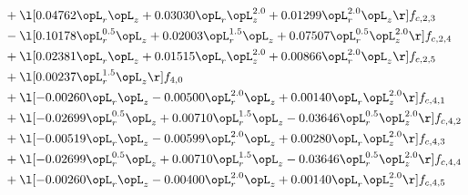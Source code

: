\begin{alignat}{2}
& + \l[  0.04762 \opL_r \opL_z +  0.03030 \opL_r \opL_z^{2.0} +  0.01299 \opL_r^{2.0} \opL_z  \r] f_{c,2,3} \nonumber \\ 
& - \l[  0.10178 \opL_r^{0.5} \opL_z +  0.02003 \opL_r^{1.5} \opL_z +  0.07507 \opL_r^{0.5} \opL_z^{2.0}  \r] f_{c,2,4} \nonumber \\ 
& + \l[  0.02381 \opL_r \opL_z +  0.01515 \opL_r \opL_z^{2.0} +  0.00866 \opL_r^{2.0} \opL_z  \r] f_{c,2,5} \nonumber \\ 
& + \l[  0.00237 \opL_r^{1.5} \opL_z  \r] f_{4,0} \nonumber \\ 
& + \l[  -0.00260 \opL_r \opL_z   -0.00500 \opL_r^{2.0} \opL_z +  0.00140 \opL_r \opL_z^{2.0}  \r] f_{c,4,1} \nonumber \\ 
& + \l[  -0.02699 \opL_r^{0.5} \opL_z +  0.00710 \opL_r^{1.5} \opL_z   -0.03646 \opL_r^{0.5} \opL_z^{2.0}  \r] f_{c,4,2} \nonumber \\ 
& + \l[  -0.00519 \opL_r \opL_z   -0.00599 \opL_r^{2.0} \opL_z +  0.00280 \opL_r \opL_z^{2.0}  \r] f_{c,4,3} \nonumber \\ 
& + \l[  -0.02699 \opL_r^{0.5} \opL_z +  0.00710 \opL_r^{1.5} \opL_z   -0.03646 \opL_r^{0.5} \opL_z^{2.0}  \r] f_{c,4,4} \nonumber \\ 
& + \l[  -0.00260 \opL_r \opL_z   -0.00400 \opL_r^{2.0} \opL_z +  0.00140 \opL_r \opL_z^{2.0}  \r] f_{c,4,5} \nonumber \\ 
\end{alignat} 


